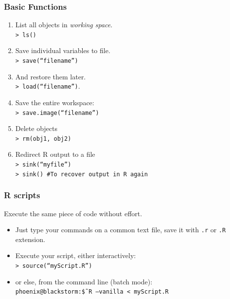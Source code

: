 \documentclass{beamer}
\begin{document}
\begin{frame}

\frametitle{Basic Functions}
  \begin{enumerate}
   \item List all objects in \textit{working space}.\\
   \texttt{> ls()}
   \item Save individual variables to file.\\
   \texttt{> save(``filename'')}\\
   \item And restore them later.\\
   \texttt{> load(``filename'')}.
   \item Save the entire workspace:\\
   \texttt{> save.image(``filename'')}
   \item Delete objects\\
   \texttt{> rm(obj1, obj2)}
   \item Redirect R output to a file\\
   \texttt{> sink(``myfile'')}\\
   \texttt{> sink() \#To recover output in R again}
  \end{enumerate}

\end{frame}


\begin{frame}

 \frametitle{R scripts}
 Execute the same piece of code without effort.
 \begin{itemize}
  \item Just type your commands on a common text
  file, save it with \texttt{.r} or \texttt{.R} extension.
  \item Execute your script, either interactively:\\
  \texttt{> source(``myScript.R'')}
  \item or else, from the command line (batch mode):\\
  \texttt{phoenix@blackstorm:\~\$ R --vanilla < myScript.R}
 \end{itemize}

\end{frame}

\end{document}
